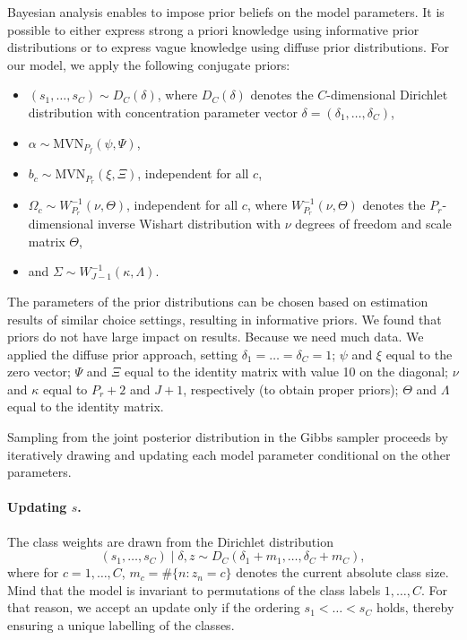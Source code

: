 \documentclass[article]{jss}
\begin{document}
Bayesian analysis enables to impose prior beliefs on the model parameters. It is possible to either express strong a priori knowledge using informative prior distributions or to express vague knowledge using diffuse prior distributions. For our model, we apply the following conjugate priors:
\begin{itemize}
	\item $(s_1,\dots,s_C)\sim D_C(\delta)$, where $D_C(\delta)$ denotes the $C$-dimensional Dirichlet distribution with concentration parameter vector $\delta = (\delta_1,\dots,\delta_C)$,
	\item $\alpha\sim \text{MVN}_{P_f}(\psi,\Psi)$,
	\item $b_c \sim \text{MVN}_{P_r}(\xi,\Xi)$, independent for all $c$,
	\item $\Omega_c \sim W^{-1}_{P_r}(\nu,\Theta)$, independent for all $c$, where $W^{-1}_{P_r}(\nu,\Theta)$ denotes the $P_r$-dimensional inverse Wishart distribution with $\nu$ degrees of freedom and scale matrix $\Theta$,
	\item and $\Sigma \sim W^{-1}_{J-1}(\kappa,\Lambda)$.
\end{itemize}

The parameters of the prior distributions can be chosen based on estimation results of similar choice settings, resulting in informative priors. We found that priors do not have large impact on results. Because we need much data. We applied the diffuse prior approach, setting $\delta_1=\dots=\delta_C=1$; $\psi$ and $\xi$ equal to the zero vector; $\Psi$ and $\Xi$ equal to the identity matrix with value 10 on the diagonal; $\nu$ and $\kappa$ equal to $P_r+2$ and $J+1$, respectively (to obtain proper priors); $\Theta$ and $\Lambda$ equal to the identity matrix.

Sampling from the joint posterior distribution in the Gibbs sampler proceeds by iteratively drawing and updating each model parameter conditional on the other parameters.

\paragraph{Updating $s$.} The class weights are drawn from the Dirichlet distribution
\begin{equation}
(s_1,\dots,s_C)\mid \delta,z \sim D_C(\delta_1+m_1,\dots,\delta_C+m_C),
\end{equation}
where for $c=1,\dots,C$, $m_c=\#\{n:z_n=c\}$ denotes the current absolute class size. Mind that the model is invariant to permutations of the class labels $1,\dots,C$. For that reason, we accept an update only if the ordering $s_1<\dots<s_C$ holds, thereby ensuring a unique labelling of the classes.
\end{document}
